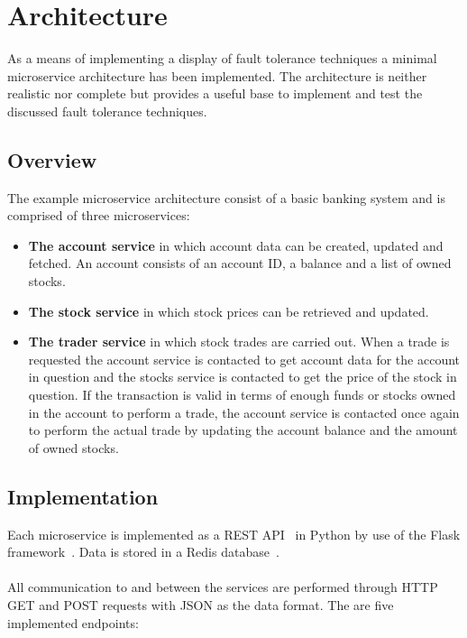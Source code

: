 \section{Architecture}
As a means of implementing a display of fault tolerance techniques a
minimal microservice architecture has been implemented. The
architecture is neither realistic nor complete but provides a useful
base to implement and test the discussed fault tolerance techniques.

\subsection{Overview}
The example microservice architecture consist of a basic banking
system and is comprised of three microservices:

\begin{itemize}
\item \textbf{The account service} in which account data can be
  created, updated and fetched. An account consists of an account ID,
  a balance and a list of owned stocks.
\item \textbf{The stock service} in which stock prices can be
  retrieved and updated.
\item \textbf{The trader service} in which stock trades are carried
  out. When a trade is requested the account service is contacted to
  get account data for the account in question  and the stocks service
  is contacted to get the price of the stock in question. If the
  transaction is valid in terms of enough funds or stocks owned in the
  account to perform a trade, the account service is contacted once
  again to perform the actual trade by updating the account balance
  and the amount of owned stocks.
\end{itemize}

\subsection{Implementation}
Each microservice is implemented as a REST
API~\cite{fielding2000dissertation} in Python by use of the Flask
framework~\cite{flask}. Data is stored in a Redis database~\cite{redis}.
\\\\
All communication to and between the services are performed through
HTTP GET and POST requests with JSON as the data format. The are five
implemented endpoints:

